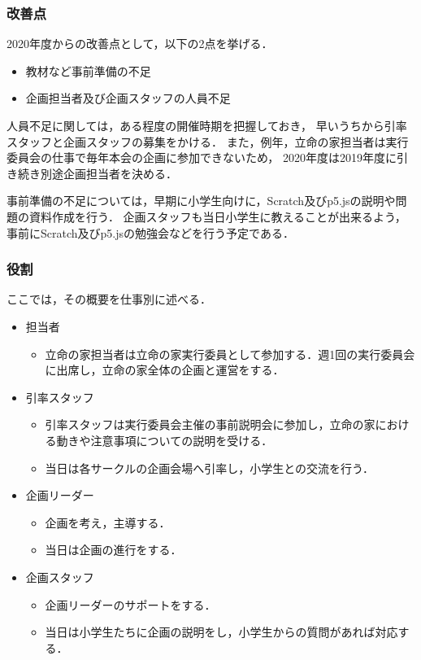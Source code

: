 \subsubsection*{改善点}

2020年度からの改善点として，以下の2点を挙げる．

\begin {itemize}
    \item 教材など事前準備の不足
    \item 企画担当者及び企画スタッフの人員不足
\end {itemize}

人員不足に関しては，ある程度の開催時期を把握しておき，
早いうちから引率スタッフと企画スタッフの募集をかける．
また，例年，立命の家担当者は実行委員会の仕事で毎年本会の企画に参加できないため，
2020年度は2019年度に引き続き別途企画担当者を決める．

事前準備の不足については，早期に小学生向けに，Scratch及びp5.jsの説明や問題の資料作成を行う．
企画スタッフも当日小学生に教えることが出来るよう，事前にScratch及びp5.jsの勉強会などを行う予定である．

\subsubsection*{役割}

ここでは，その概要を仕事別に述べる．

\begin{itemize}
 \item 担当者
  \begin{itemize}
  \item 立命の家担当者は立命の家実行委員として参加する．週1回の実行委員会に出席し，立命の家全体の企画と運営をする．
  \end{itemize}
 \item 引率スタッフ
　\begin{itemize}
  \item 引率スタッフは実行委員会主催の事前説明会に参加し，立命の家における動きや注意事項についての説明を受ける．
  \item 当日は各サークルの企画会場へ引率し，小学生との交流を行う．
  \end{itemize}
 \item 企画リーダー
  \begin{itemize}
  \item 企画を考え，主導する．
  \item 当日は企画の進行をする．
  \end{itemize}
 \item 企画スタッフ
  \begin{itemize}
  \item 企画リーダーのサポートをする．
  \item 当日は小学生たちに企画の説明をし，小学生からの質問があれば対応する．
  \end{itemize}
\end{itemize}
